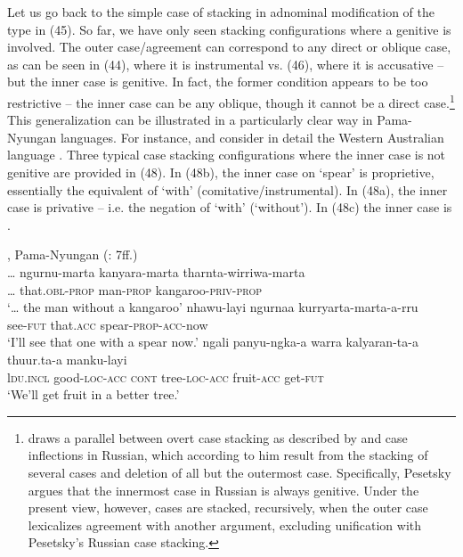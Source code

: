 \documentclass[output=paper]{langsci/langscibook}
\begin{document}
Let us go back to the simple case of stacking in adnominal modification of the type in (45). So far, we have only seen stacking configurations where a genitive is involved. The outer case\slash agreement can correspond to any direct or oblique case, as can be seen in (44), where it is instrumental vs. (46), where it is accusative – but the inner case is genitive. In fact, the former condition appears to be too restrictive – the inner case can be any oblique, though it cannot be a direct case.\footnote{\citet{Pesetsky2013} draws a parallel between overt case stacking as described by \citet{Richards2013} and case inflections in Russian, which according to him result from the stacking of several cases and deletion of all but the outermost case. Specifically, Pesetsky argues that the innermost case in Russian is always genitive. Under the present view, however, cases are stacked, recursively, when the outer case lexicalizes agreement with another argument, excluding unification with Pesetsky’s Russian case stacking.}  This generalization can be illustrated in a particularly clear way in Pama-Nyungan languages. For instance, \citet{Dench1988} and \citet{Dench1995} consider in detail the Western Australian language . Three typical case stacking configurations where the inner case is not genitive are provided in (48). In (48b), the inner case on ‘spear’ is proprietive, essentially the equivalent of  ‘with’ (comitative\slash instrumental). In (48a), the inner case is privative – i.e. the negation of ‘with’ (‘without’). In (48c) the inner case is . 

\ea%
    , Pama-Nyungan (\citealt{Dench1988}: 7ff.)\label{ex:manzini:48}\\
    \ea
    \gll … ngurnu-marta   kanyara-marta  tharnta-wirriwa-marta    \\
         … that.\textsc{obl-prop}   man-\textsc{prop}   kangaroo-\textsc{priv-prop}\\
    \glt ‘… the man without a kangaroo’
    \ex  
    \gll  nhawu-layi   ngurnaa  kurryarta-marta-a-rru    \\
         see-\textsc{fut}   that.\textsc{acc}   spear-\textsc{prop-acc}{}-now\\
    \glt ‘I'll see that one with a spear now.’
    \ex  
    \gll ngali   panyu-ngka-a   warra  kalyaran-ta-a   thuur.ta-a   manku-layi\\
         l\textsc{du.incl}   good-\textsc{loc-acc}  \textsc{cont}   tree-\textsc{loc-acc}   fruit-\textsc{acc}   get-\textsc{fut}\\
    \glt ‘We'll get fruit in a better tree.’ 
    \z
\z 
\end{document}
